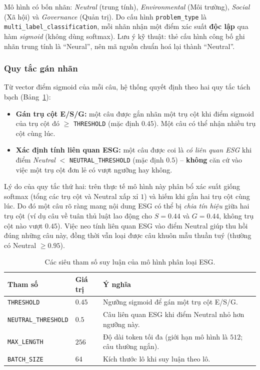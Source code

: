 \documentclass{article}
\begin{document}
Mô hình có bốn nhãn: \textit{Neutral} (trung tính), \textit{Environmental} (Môi
trường), \textit{Social} (Xã hội) và \textit{Governance} (Quản trị). Do cấu hình
\texttt{problem\_type} là \texttt{multi\_label\_classification}, mỗi nhãn nhận một
điểm xác suất \textbf{độc lập} qua hàm \textit{sigmoid} (không dùng softmax). Lưu
ý kỹ thuật: thẻ cấu hình công bố ghi nhãn trung tính là ``Neural'', nên mã nguồn
chuẩn hoá lại thành ``Neutral''.

\subsubsection{Quy tắc gán nhãn}

Từ vector điểm sigmoid của mỗi câu, hệ thống quyết định theo hai quy tắc tách bạch
(Bảng~\ref{tab:thresholds}):

\begin{itemize}
  \item \textbf{Gán trụ cột E/S/G:} một câu được gắn nhãn một trụ cột khi điểm
        sigmoid của trụ cột đó $\ge$ \texttt{THRESHOLD} (mặc định $0.45$). Một câu
        có thể nhận nhiều trụ cột cùng lúc.
  \item \textbf{Xác định tính liên quan ESG:} một câu được coi là \textit{có liên
        quan ESG} khi điểm \textit{Neutral} $<$ \texttt{NEUTRAL\_THRESHOLD}
        (mặc định $0.5$) -- \textbf{không} căn cứ vào việc một trụ cột đơn lẻ có
        vượt ngưỡng hay không.
\end{itemize}

\noindent Lý do của quy tắc thứ hai: trên thực tế mô hình này phân bổ xác suất
giống softmax (tổng các trụ cột và Neutral xấp xỉ $1$) và hiếm khi gắn hai trụ cột
cùng lúc. Do đó một câu rõ ràng mang nội dung ESG có thể bị \textit{chia tín hiệu}
giữa hai trụ cột (ví dụ câu về tuân thủ luật lao động cho $S=0.44$ và $G=0.44$,
không trụ cột nào vượt $0.45$). Việc neo tính liên quan ESG vào điểm Neutral giúp
thu hồi đúng những câu này, đồng thời vẫn loại được câu khuôn mẫu thuần tuý
(thường có Neutral $\ge 0.95$).

\begin{table}[H]
  \centering
  \caption{Các siêu tham số suy luận của mô hình phân loại ESG.}
  \label{tab:thresholds}
  \begin{tabularx}{\linewidth}{l l X}
    \hline
    \textbf{Tham số} & \textbf{Giá trị} & \textbf{Ý nghĩa} \\
    \hline
    \texttt{THRESHOLD}         & $0.45$ & Ngưỡng sigmoid để gán một trụ cột E/S/G. \\
    \texttt{NEUTRAL\_THRESHOLD} & $0.5$  & Câu liên quan ESG khi điểm Neutral nhỏ hơn ngưỡng này. \\
    \texttt{MAX\_LENGTH}       & $256$  & Độ dài token tối đa (giới hạn mô hình là $512$; câu thường ngắn). \\
    \texttt{BATCH\_SIZE}       & $64$   & Kích thước lô khi suy luận theo lô. \\
    \hline
  \end{tabularx}
\end{table}
\end{document}

